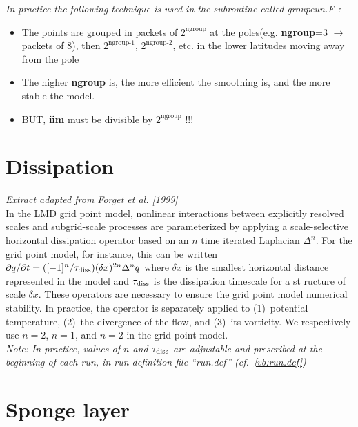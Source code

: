 {\it In practice the following technique is used in the subroutine called {\em groupeun.F} :
\begin{itemize}
\item The points are grouped in packets of $2^{\mbox{ngroup}}$
      at the poles(e.g. {\bf ngroup}=3 $\rightarrow$ packets of 8),
 then $2^{\mbox{ngroup-1}}$,
      $2^{\mbox{ngroup-2}}$, etc. in the lower latitudes moving away from the pole
 
   \item The higher {\bf ngroup} is, the more efficient the smoothing is, and the more stable the model.
 
\item   BUT, {\bf iim} must be divisible by $2^{\mbox{ngroup}}$ !!!
 

\end{itemize}

}


\section{Dissipation}

{\it Extract adapted from Forget et al. [1999]}\\

In the LMD grid point model,
nonlinear interactions between explicitly resolved scales
and subgrid-scale processes are
parameterized by applying a scale-selective horizontal
dissipation operator
based on an $n$ time iterated Laplacian $\Delta^{n}$.
For the grid point model, for instance, this can be written
${\partial q}/{\partial t} = ([-1]^{n}/ {\tau_{\mbox{\scriptsize
diss}}})
(\delta x)^{2n} \Delta^{n} q$
where $\delta x$ is the smallest horizontal distance represented in the
model and $\tau_{\mbox{\scriptsize diss}}$ is the dissipation timescale
for a st
ructure of scale
$\delta x$.
These operators are necessary to ensure the grid point model
numerical stability.
In practice, the operator is
separately applied to (1)~potential temperature, (2)~the divergence of
the flow,
and (3)~its vorticity.
We respectively use  $n=2$, $n=1$, and $n=2$ in the grid point model.\\

{\it Note: In practice,
values of $n$ and $\tau_{\mbox{\scriptsize diss}}$
are adjustable and prescribed at the beginning of each run, in run definition file ``run.def'' (cf.~\ref{vb:run.def}) } 

\section{Sponge layer}

